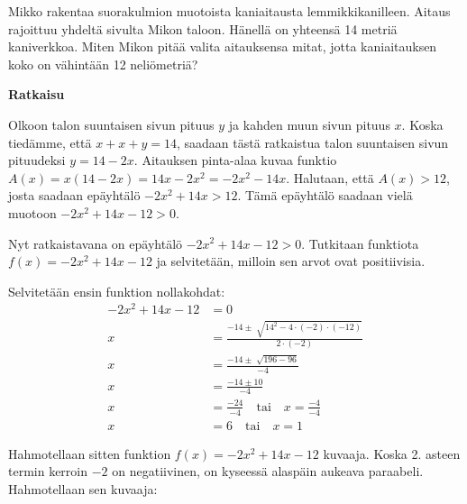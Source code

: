 \begin{esimerkki}
Mikko rakentaa suorakulmion muotoista kaniaitausta lemmikkikanilleen. Aitaus rajoittuu yhdeltä sivulta Mikon taloon. Hänellä on yhteensä 14 metriä kaniverkkoa. Miten Mikon pitää valita aitauksensa mitat, jotta kaniaitauksen koko on vähintään 12 neliömetriä?


\textbf{Ratkaisu}

Olkoon talon suuntaisen sivun pituus $y$ ja kahden muun sivun pituus $x$. Koska tiedämme, että $x+x+y=14$, saadaan tästä ratkaistua talon suuntaisen sivun pituudeksi $y=14 - 2x$.
Aitauksen pinta-alaa kuvaa funktio $A(x)=x(14-2x)=14x-2x^2=-2x^2-14x$.
Halutaan, että $A(x)>12$, josta saadaan epäyhtälö $-2x^2+14x>12$. Tämä epäyhtälö saadaan vielä muotoon $-2x^2+14x-12>0$.

Nyt ratkaistavana on epäyhtälö $-2x^2+14x-12>0$. Tutkitaan funktiota $f(x)=-2x^2+14x-12$ ja selvitetään, milloin sen arvot ovat positiivisia.

Selvitetään ensin funktion nollakohdat:
\begin{align*}
-2x^2+14x-12&=0 \\
x&=\frac{-14 \pm \sqrt[]{14^2-4 \cdot (-2) \cdot (-12)}}{2 \cdot (-2)} \\
x&=\frac{-14 \pm \sqrt[]{196-96}}{-4} \\
x&=\frac{-14 \pm 10}{-4} \\
x&=\frac{-24}{-4} \quad \text{tai} \quad x=\frac{-4}{-4} \\
x&=6 \quad \text{tai} \quad x=1
\end{align*}

Hahmotellaan sitten funktion $f(x)=-2x^2+14x-12$ kuvaaja. Koska 2. asteen termin kerroin $-2$ on negatiivinen, on kyseessä alaspäin aukeava paraabeli. Hahmotellaan sen kuvaaja:

\begin{lukusuora}{-2.5}{2.5}{5}
\end{lukusuora}


\end{esimerkki}
